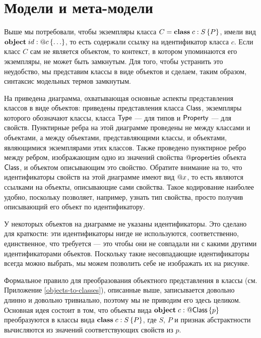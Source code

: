 \section{Модели и мета-модели}

Выше мы потребовали, чтобы экземпляры класса $C = \mathbf{class}\;c : S \left\{P\right\}$, имели вид $\mathbf{object}\;id : @c\left\{ \ldots \right\}$, то есть содержали ссылку на идентификатор класса $c$. Если класс $C$ сам не является объектом, то контекст, в котором упоминаются его экземпляры, не может быть замкнутым. Для того, чтобы устранить это неудобство, мы представим классы в виде объектов и сделаем, таким образом, синтаксис модельных термов замкнутым.

На  приведена диаграмма, охватывающая основные аспекты представления классов в виде объектов: приведены представления класса $\mathsf{Class}$, экземпляры которого обозначают классы, класса $\mathsf{Type}$ --- для типов и $\mathsf{Property}$ --- для свойств. Пунктирные ребра на этой диаграмме проведены не между классами и объектами, а между объектами, представляющими классы, и объектами, являющимися экземплярами этих классов. Также проведено пунктирное ребро между ребром, изображающим одно из значений свойства $@\mathsf{properties}$ объекта $\mathsf{Class}$, и объектом описывающим это свойство.
%
%
%
Обратите внимание на то, что идентификаторы свойств на этой диаграмме имеют вид $@x$, то есть являются ссылками на объекты, описывающие сами свойства. Такое кодирование наиболее удобно, поскольку позволяет, например, узнать тип свойства, просто получив описывающий его объект по идентификатору.

У некоторых объектов на диаграмме  не указаны идентификаторы. Это сделано для краткости: эти идентификаторы нигде не используются, соответственно, единственное, что требуется --- это чтобы они не совпадали ни с какими другими идентификаторами объектов. Поскольку такие несовпадающие идентификаторы всегда можно выбрать, мы можем позволить себе не изображать их на рисунке.

Формальное правило для преобразования объектного представления в классы (см. Приложение \ref{objects-to-classes}), описанные выше, записывается довольно длинно и довольно тривиально, поэтому мы не приводим его здесь целиком. Основная идея состоит в том, что объекты вида $\mathbf{object}\;c : @\mathsf{Class}\left\{ p \right\}$ преобразуются в классы вида $\mathbf{class}\;c : S \left\{P\right\}$, где $S$, $P$ и признак абстрактности вычисляются из значений соответствующих свойств из $p$.

